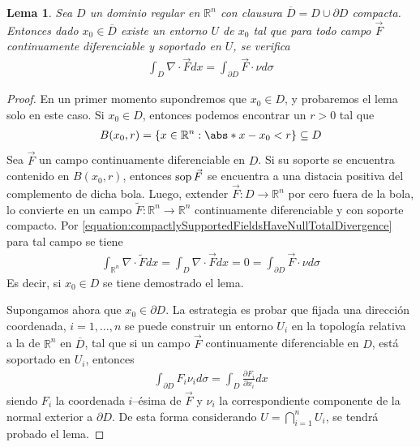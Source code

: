 \documentclass{report}
\newcommand{\realNumbers}{\mathbb{R}}
\newtheorem{lemma}{Lema}
\theoremstyle{remark}
\DeclareMathOperator{\support}{\textnormal{sop}}
\begin{document}
  \begin{lemma}
    \label{lemma:localDivergenceTheorem}
    Sea \(D\) un dominio regular en \(\realNumbers^n\) con clausura \(\overline{D} = D \cup \partial D\) compacta.
    Entonces dado \(x_0 \in \overline{D}\) existe un entorno \(U\) de \(x_0\) tal que para todo campo \(\vec{F}\) continuamente diferenciable y soportado en \(U\), se verifica
    \begin{align}
      \int_D \nabla \cdot \vec{F} d x
      =
      \int_{\partial D} \vec{F} \cdot \nu d \sigma
    \end{align}
  \end{lemma}
  \begin{proof}
    En un primer momento supondremos que \(x_0 \in D\), y probaremos el lema solo en este caso.
    Si \(x_0 \in D\), entonces podemos encontrar un \(r > 0\) tal que 
    \begin{align}
      B(x_0, r)
      =
      \{
        x \in \realNumbers^n : \abs*{x - x_0} < r
      \}
      \subseteq
      D
    \end{align}
    Sea \(\vec{F}\) un campo continuamente diferenciable en \(D\).
    Si su soporte se encuentra contenido en \(B(x_0, r)\), entonces \(\support \vec{F}\) se encuentra a una distacia positiva del complemento de dicha bola.
    Luego, extender \(\vec{F} : D \rightarrow \realNumbers^n\) por cero fuera de la bola, lo convierte en un campo \(\tilde{F} : \realNumbers^n \rightarrow \realNumbers^n\) continuamente diferenciable y con soporte compacto.
    Por \eqref{equation:compactlySupportedFieldsHaveNullTotalDivergence} para tal campo se tiene
    \begin{align}
      \int_{\realNumbers^n} \nabla \cdot \tilde{F} dx
      =
      \int_D \nabla \cdot \vec{F} dx
      =
      0
      =
      \int_{\partial D} \vec{F} \cdot \nu d \sigma
    \end{align}
    Es decir, si \(x_0 \in D\) se tiene demostrado el lema.

    Supongamos ahora que \(x_0 \in \partial D\).
    La estrategia es probar que fijada una dirección coordenada, \(i = 1, \dots, n\) se puede construir un entorno \(U_i\) en la topología relativa a la de \(\realNumbers^n\) en \(\overline{D}\), tal que si un campo \(\vec{F}\) continuamente diferenciable en \(D\), está soportado en \(U_i\), entonces
    \begin{align}
      \label{equation:divergenceTheoremInTheIthDirection}
      \int_{\partial D}
        F_i \nu_i
      d \sigma
      =
      \int_D
        \frac{\partial F_i}{\partial x_i}
      dx
    \end{align}
    siendo \(F_i\) la coordenada \(i\)--ésima de \(\vec{F}\) y \(\nu_i\) la correspondiente componente de la normal exterior a \(\partial D\).
    De esta forma considerando \(U = \bigcap_{i = 1}^n U_i\), se tendrá probado el lema.


\end{proof}
\end{document}
